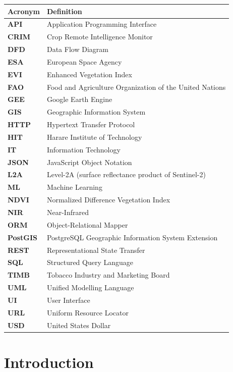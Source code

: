 \documentclass[12pt,a4paper]{report}
\begin{document}
\begin{longtable}{>{\bfseries}p{3cm} p{10cm}}
\toprule
Acronym & Definition \\
\midrule
API & Application Programming Interface \\
CRIM & Crop Remote Intelligence Monitor \\
DFD & Data Flow Diagram \\
ESA & European Space Agency \\
EVI & Enhanced Vegetation Index \\
FAO & Food and Agriculture Organization of the United Nations \\
GEE & Google Earth Engine \\
GIS & Geographic Information System \\
HTTP & Hypertext Transfer Protocol \\
HIT & Harare Institute of Technology \\
IT & Information Technology \\
JSON & JavaScript Object Notation \\
L2A & Level-2A (surface reflectance product of Sentinel-2) \\
ML & Machine Learning \\
NDVI & Normalized Difference Vegetation Index \\
NIR & Near-Infrared \\
ORM & Object-Relational Mapper \\
PostGIS & PostgreSQL Geographic Information System Extension \\
REST & Representational State Transfer \\
SQL & Structured Query Language \\
TIMB & Tobacco Industry and Marketing Board \\
UML & Unified Modelling Language \\
UI & User Interface \\
URL & Uniform Resource Locator \\
USD & United States Dollar \\
\bottomrule
\end{longtable}

\cleardoublepage
{}
\setcounter{page}{1}

\chapter{Introduction}
\end{document}
